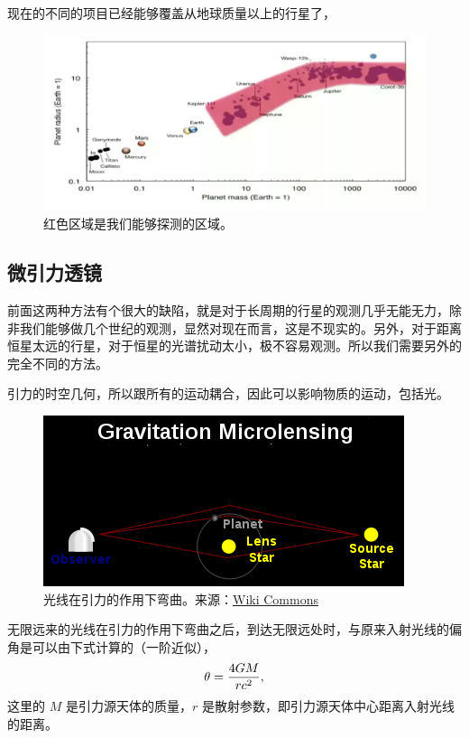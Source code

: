 \documentclass[letterpaper,10pt,english]{sphinxmanual}
\begin{document}
现在的不同的项目已经能够覆盖从地球质量以上的行星了，
\begin{figure}[htbp]
\centering
\capstart

\includegraphics{massRangeDetected.png}
\caption{红色区域是我们能够探测的区域。}\end{figure}


\subsection{微引力透镜}
\label{detection:id13}\label{detection:index-9}
前面这两种方法有个很大的缺陷，就是对于长周期的行星的观测几乎无能无力，除非我们能够做几个世纪的观测，显然对现在而言，这是不现实的。另外，对于距离恒星太远的行星，对于恒星的光谱扰动太小，极不容易观测。所以我们需要另外的完全不同的方法。

引力的时空几何，所以跟所有的运动耦合，因此可以影响物质的运动，包括光。
\begin{figure}[htbp]
\centering
\capstart

\includegraphics{400px-Gravitational_micro_rev.svg.png}
\caption{光线在引力的作用下弯曲。来源：\href{https://commons.wikimedia.org/wiki/File:Gravitational\_micro\_rev.svg}{Wiki Commons}}\end{figure}

无限远来的光线在引力的作用下弯曲之后，到达无限远处时，与原来入射光线的偏角是可以由下式计算的（一阶近似），
\begin{gather}
\begin{split}\theta=\frac{4GM}{rc^2},\end{split}\notag
\end{gather}
这里的 \(M\) 是引力源天体的质量，\(r\) 是散射参数，即引力源天体中心距离入射光线的距离。
\end{document}
